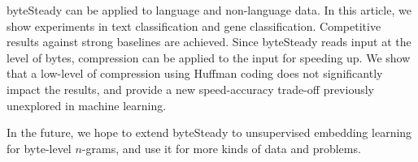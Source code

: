 \documentclass[sigconf,review, anonymous]{acmart}
\begin{document}
byteSteady can be applied to language and non-language data. In this article, we show experiments in text classification and gene classification. Competitive results against strong baselines are achieved. Since byteSteady reads input at the level of bytes, compression can be applied to the input for speeding up. We show that a low-level of compression using Huffman coding does not significantly impact the results, and provide a new speed-accuracy trade-off previously unexplored in machine learning.

In the future, we hope to extend byteSteady to unsupervised embedding learning for byte-level \(n\)-grams, and use it for more kinds of data and problems.



\end{document}
